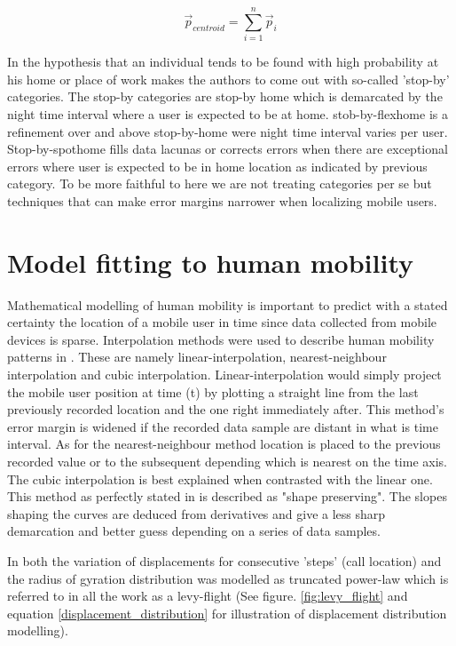 \documentclass[12pt, a4paper]{report}
\theoremstyle{definition}
\theoremstyle{definition}%
\theoremstyle{definition}%
\theoremstyle{definition}%
\theoremstyle{definition}%
\theoremstyle{definition}%
\begin{document}
\begin{equation}
{\stackrel{\to }{p}}_{centroid} = \sum _{i=1}^{n}{\stackrel{\to }{p}}_{i}
\end{equation}

In \cite{Hoteit2016} the hypothesis that an individual tends to be found with high probability at his home or place of work makes the authors to come out with so-called 'stop-by' categories. The stop-by categories are stop-by home which is demarcated by the night time interval where a user is expected to be at home. stob-by-flexhome is a refinement over and above stop-by-home were night time interval varies per user. Stop-by-spothome fills data lacunas or corrects errors when there are exceptional errors where user is expected to be in home location as indicated by previous category. To be more faithful to \cite{Hoteit2016} here we are not treating categories per se but techniques that can make error margins narrower when localizing mobile users.

\section{Model fitting to human mobility} \label{methodology_modelling}
Mathematical modelling of human mobility is important to predict with a stated certainty the location of a mobile user in time since data collected from mobile devices is sparse. Interpolation methods were used to describe human mobility patterns in \cite{Hoteit2014}. These are namely linear-interpolation, nearest-neighbour interpolation and cubic interpolation. Linear-interpolation would simply project the mobile user position at time (t) by plotting a straight line from the last previously recorded location and the one right immediately after. This method's error margin is widened if the recorded data sample are distant in what is time interval. As for the nearest-neighbour method location is placed to the previous recorded value or to the subsequent depending which is nearest on the time axis. The cubic interpolation is best explained when contrasted with the linear one. This method as perfectly stated in \cite{Hoteit2014}  is described as "shape preserving". The slopes shaping the curves are deduced from derivatives and give a less sharp demarcation and better guess depending on a series of data samples.

In \cite{Gonzalez2008} both the variation of displacements for consecutive 'steps' (call location) and the radius of gyration distribution was modelled as truncated power-law which is referred to in all the work as a levy-flight (See figure. \ref{fig:levy_flight} and equation \ref{displacement_distribution} for illustration of displacement distribution modelling). 
\end{document}
